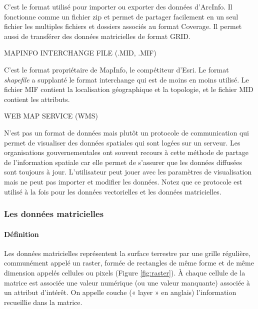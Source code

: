 \documentclass[
  12pt,
]{krantz}
\renewenvironment{quote}{\begin{VF}}{\end{VF}}
\begin{document}
C'est le format utilisé pour importer ou exporter des données d'ArcInfo. Il fonctionne comme un fichier zip et permet de partager facilement en un seul fichier les multiples fichiers et dossiers associés au format Coverage. Il permet aussi de transférer des données matricielles de format GRID.

\begin{quote}
MAPINFO INTERCHANGE FILE (.MID, .MIF)
\end{quote}

C'est le format propriétaire de MapInfo, le compétiteur d'Esri. Le format \emph{shapefile} a supplanté le format interchange qui est de moins en moins utilisé. Le fichier MIF contient la localisation géographique et la topologie, et le fichier MID contient les attributs.

\begin{quote}
WEB MAP SERVICE (WMS)
\end{quote}

N'est pas un format de données mais plutôt un protocole de communication qui permet de visualiser des données spatiales qui sont logées sur un serveur. Les organisations gouvernementales ont souvent recours à cette méthode de partage de l'information spatiale car elle permet de s'assurer que les données diffusées sont toujours à jour. L'utilisateur peut jouer avec les paramètres de visualisation mais ne peut pas importer et modifier les données. Notez que ce protocole est utilisé à la fois pour les données vectorielles et les données matricielles.

\hypertarget{les-donnuxe9es-matricielles}{%
\subsubsection{Les données matricielles}\label{les-donnuxe9es-matricielles}}

\hypertarget{duxe9finition-1}{%
\paragraph{Définition}\label{duxe9finition-1}}

Les données matricielles représentent la surface terrestre par une grille régulière, communément appelé un raster, formée de rectangles de même forme et de même dimension appelés cellules ou pixels (Figure \ref{fig:raster}). À chaque cellule de la matrice est associée une valeur numérique (ou une valeur manquante) associée à un attribut d'intérêt. On appelle couche (« layer » en anglais) l'information recueillie dans la matrice.
\end{document}
